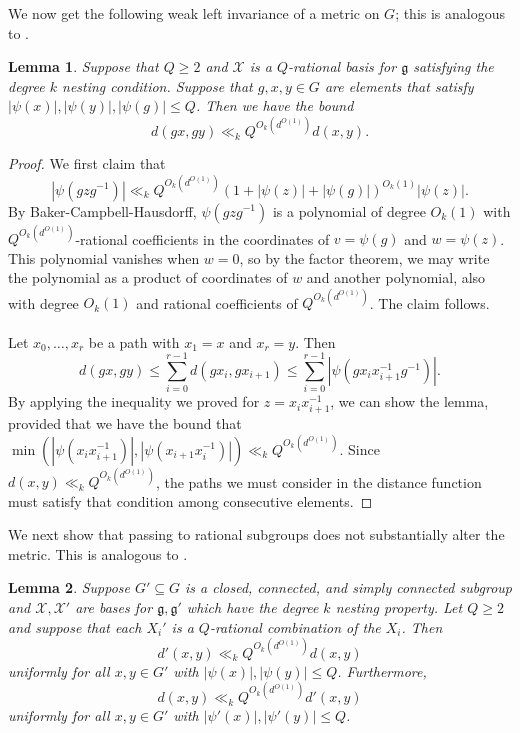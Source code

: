 \documentclass[11pt, a4paper]{amsart}
\theoremstyle{plain}
\theoremstyle{plain}
\newtheorem{lemma}{Lemma}
\theoremstyle{definition}
\theoremstyle{remark}
\numberwithin{equation}{section}
\numberwithin{lemma}{section}
\numberwithin{proposition}{section}
\numberwithin{corollary}{section}
\numberwithin{definition}{section}
\numberwithin{claim}{section}
\begin{document}
We now get the following weak left invariance of a metric on $G$; this is analogous to \cite[Lemma A.5]{GT12}.
\begin{lemma}\label{l:leftinvariance}
Suppose that $Q \ge 2$ and $\mathcal{X}$ is a $Q$-rational basis for $\mathfrak{g}$ satisfying the degree $k$ nesting condition. Suppose that $g, x, y \in G$ are elements that satisfy $|\psi(x)|, |\psi(y)|, |\psi(g)| \le Q$. Then we have the bound
$$d(gx, gy) \ll_k Q^{O_k(d^{O(1)})}d(x, y).$$
\end{lemma}
\begin{proof}
We first claim that
$$|\psi(gzg^{-1})| \ll_k Q^{O_k(d^{O(1)})}(1 + |\psi(z)| + |\psi(g)|)^{O_k(1)}|\psi(z)|.$$
By Baker-Campbell-Hausdorff, $\psi(gzg^{-1})$ is a polynomial of degree $O_k(1)$ with $Q^{O_k(d^{O(1)})}$-rational coefficients in the coordinates of $v = \psi(g)$ and $w = \psi(z)$. This polynomial vanishes when $w = 0$, so by the factor theorem, we may write the polynomial as a product of coordinates of $w$ and another polynomial, also with degree $O_k(1)$ and rational coefficients of $Q^{O_k(d^{O(1)})}$. The claim follows. \\\\
Let $x_0, \dots, x_r$ be a path with $x_1 = x$ and $x_r = y$. Then
$$d(gx, gy) \le \sum_{i = 0}^{r - 1} d(gx_i, gx_{i + 1}) \le \sum_{i = 0}^{r - 1} |\psi(gx_ix_{i + 1}^{-1}g^{-1})|.$$
By applying the inequality we proved for $z = x_ix_{i + 1}^{-1}$, we can show the lemma, provided that we have the bound that $\min(|\psi(x_{i}x_{i + 1}^{-1})|, |\psi(x_{i + 1} x_i^{-1})|) \ll_k Q^{O_k(d^{O(1)})}$. Since $d(x, y) \ll_k Q^{O_k(d^{O(1)})}$, the paths we must consider in the distance function must satisfy that condition among consecutive elements.
\end{proof}
We next show that passing to rational subgroups does not substantially alter the metric. This is analogous to \cite[Lemma A.6]{GT12}.
\begin{lemma}\label{l:subgroupcomparison}
Suppose $G' \subseteq G$ is a closed, connected, and simply connected subgroup and $\mathcal{X}, \mathcal{X}'$ are bases for $\mathfrak{g}, \mathfrak{g}'$ which have the degree $k$ nesting property. Let $Q \ge 2$ and suppose that each $X_i'$ is a $Q$-rational combination of the $X_i$. Then
$$d'(x, y) \ll_k Q^{O_k(d^{O(1)})} d(x, y)$$
uniformly for all $x, y \in G'$ with $|\psi(x)|, |\psi(y)| \le Q$. Furthermore,
$$d(x, y) \ll_k Q^{O_k(d^{O(1)})} d'(x, y)$$
uniformly for all $x, y \in G'$ with $|\psi'(x)|, |\psi'(y)| \le Q$.
\end{lemma}
\end{document}
